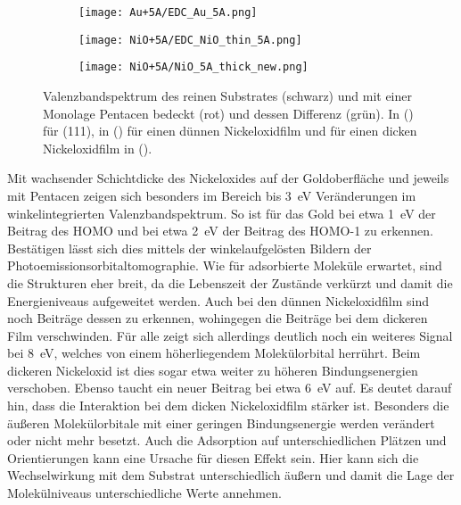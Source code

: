         \begin{figure}
            \centering
            \begin{subfigure}[t]{0.30\textwidth}
                \centering
                \texttt{[image: Au+5A/EDC\_Au\_5A.png]}
                \subcaption{}
                \label{fig:EDC_Au+5A}
            \end{subfigure}
            \begin{subfigure}[t]{0.30\textwidth}
                \centering
                \texttt{[image: NiO+5A/EDC\_NiO\_thin\_5A.png]}
                \subcaption{}
                \label{fig:EDC_NiO_thin+5A}
            \end{subfigure}
            \begin{subfigure}[t]{0.30\textwidth}
                \centering
                \texttt{[image: NiO+5A/NiO\_5A\_thick\_new.png]}
                \subcaption{}
                \label{fig:EDC_NiO+5A}
            \end{subfigure}
            \caption{Valenzbandspektrum des reinen Substrates (schwarz) und mit einer Monolage Pentacen bedeckt (rot) und dessen Differenz (grün).
            In () für (111), in () für einen dünnen Nickeloxidfilm und für einen dicken Nickeloxidfilm in ().}
        \end{figure}
        Mit wachsender Schichtdicke des Nickeloxides auf der Goldoberfläche und jeweils mit Pentacen zeigen sich besonders im Bereich bis \SI{3}{\electronvolt} Veränderungen im winkelintegrierten Valenzbandspektrum.
        So ist für das Gold bei etwa \SI{1}{\electronvolt} der Beitrag des HOMO und bei etwa \SI{2}{\electronvolt} der Beitrag des HOMO-1 zu erkennen.
        Bestätigen lässt sich dies mittels der winkelaufgelösten Bildern der Photoemissionsorbitaltomographie.
        Wie für adsorbierte Moleküle erwartet, sind die Strukturen eher breit, da die Lebenszeit der Zustände verkürzt und damit die Energieniveaus aufgeweitet werden.
        Auch bei den dünnen Nickeloxidfilm sind noch Beiträge dessen zu erkennen, wohingegen die Beiträge bei dem dickeren Film verschwinden.
        Für alle zeigt sich allerdings deutlich noch ein weiteres Signal bei \SI{8}{\electronvolt}, welches von einem höherliegendem Molekülorbital herrührt.
        Beim dickeren Nickeloxid ist dies sogar etwa weiter zu höheren Bindungsenergien verschoben.
        Ebenso taucht ein neuer Beitrag bei etwa \SI{6}{\electronvolt} auf.
        Es deutet darauf hin, dass die Interaktion bei dem dicken Nickeloxidfilm stärker ist.
        Besonders die äußeren Molekülorbitale mit einer geringen Bindungsenergie werden verändert oder nicht mehr besetzt.
        Auch die Adsorption auf unterschiedlichen Plätzen und Orientierungen kann eine Ursache für diesen Effekt sein.
        Hier kann sich die Wechselwirkung mit dem Substrat unterschiedlich äußern und damit die Lage der Molekülniveaus unterschiedliche Werte annehmen.

